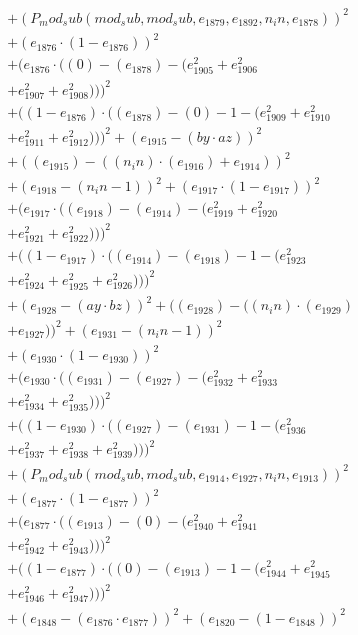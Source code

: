 \documentclass[10pt, a4paper]{article}
\begin{document}
\begin{small}
\begin{align*}
& + (P_mod_sub(mod_sub, mod_sub, e_{1879}, e_{1892}, n_in, e_{1878}))^{2} \\
& + (e_{1876}  \cdot  (1 - e_{1876}))^{2} \\
& + (e_{1876}  \cdot  ((0) - (e_{1878}) - (e_{1905}^{2} + e_{1906}^{2} \\
& + e_{1907}^{2} + e_{1908}^{2})))^{2} \\
& + ((1 - e_{1876})  \cdot  ((e_{1878}) - (0) - 1 - (e_{1909}^{2} + e_{1910}^{2} \\
& + e_{1911}^{2} + e_{1912}^{2})))^{2} + (e_{1915} - (by  \cdot  az))^{2} \\
& + ((e_{1915}) - ((n_in)  \cdot  (e_{1916}) + e_{1914}))^{2} \\
& + (e_{1918} - (n_in - 1))^{2} + (e_{1917}  \cdot  (1 - e_{1917}))^{2} \\
& + (e_{1917}  \cdot  ((e_{1918}) - (e_{1914}) - (e_{1919}^{2} + e_{1920}^{2} \\
& + e_{1921}^{2} + e_{1922}^{2})))^{2} \\
& + ((1 - e_{1917})  \cdot  ((e_{1914}) - (e_{1918}) - 1 - (e_{1923}^{2} \\
& + e_{1924}^{2} + e_{1925}^{2} + e_{1926}^{2})))^{2} \\
& + (e_{1928} - (ay  \cdot  bz))^{2} + ((e_{1928}) - ((n_in)  \cdot  (e_{1929}) \\
& + e_{1927}))^{2} + (e_{1931} - (n_in - 1))^{2} \\
& + (e_{1930}  \cdot  (1 - e_{1930}))^{2} \\
& + (e_{1930}  \cdot  ((e_{1931}) - (e_{1927}) - (e_{1932}^{2} + e_{1933}^{2} \\
& + e_{1934}^{2} + e_{1935}^{2})))^{2} \\
& + ((1 - e_{1930})  \cdot  ((e_{1927}) - (e_{1931}) - 1 - (e_{1936}^{2} \\
& + e_{1937}^{2} + e_{1938}^{2} + e_{1939}^{2})))^{2} \\
& + (P_mod_sub(mod_sub, mod_sub, e_{1914}, e_{1927}, n_in, e_{1913}))^{2} \\
& + (e_{1877}  \cdot  (1 - e_{1877}))^{2} \\
& + (e_{1877}  \cdot  ((e_{1913}) - (0) - (e_{1940}^{2} + e_{1941}^{2} \\
& + e_{1942}^{2} + e_{1943}^{2})))^{2} \\
& + ((1 - e_{1877})  \cdot  ((0) - (e_{1913}) - 1 - (e_{1944}^{2} + e_{1945}^{2} \\
& + e_{1946}^{2} + e_{1947}^{2})))^{2} \\
& + (e_{1848} - (e_{1876}  \cdot  e_{1877}))^{2} + (e_{1820} - (1 - e_{1848}))^{2} \\

\end{align*}
\end{small}
\end{document}
